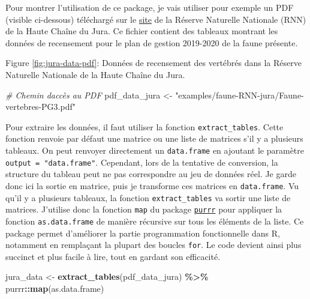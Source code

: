 \documentclass[
  french,
]{book}
\newenvironment{Shaded}{\begin{snugshade}}{\end{snugshade}}
\newcommand{\CommentTok}[1]{\textcolor[rgb]{0.56,0.35,0.01}{\textit{#1}}}
\newcommand{\KeywordTok}[1]{\textcolor[rgb]{0.13,0.29,0.53}{\textbf{#1}}}
\newcommand{\NormalTok}[1]{#1}
\newcommand{\OperatorTok}[1]{\textcolor[rgb]{0.81,0.36,0.00}{\textbf{#1}}}
\newcommand{\StringTok}[1]{\textcolor[rgb]{0.31,0.60,0.02}{#1}}
\begin{document}
Pour montrer l'utilisation de ce package, je vais utiliser pour exemple un PDF
(visible ci-dessous) téléchargé sur le
\href{https://www.rnn-hautechainedujura.fr/patrimoine-naturel/faune/}{site} de la
Réserve Naturelle Nationale (RNN) de la Haute Chaîne du Jura. Ce fichier
contient des tableaux montrant les données de recensement pour le plan de
gestion 2019-2020 de la faune présente.

\label{fig:jura-data-pdf} Figure \ref{fig:jura-data-pdf}: Données de recensement des vertébrés dans la Réserve Naturelle Nationale de la Haute Chaîne du Jura.

\begin{Shaded}
\begin{Highlighting}[]
\CommentTok{\# Chemin d\textquotesingle{}accès au PDF}
\NormalTok{pdf\_data\_jura \textless{}{-}}\StringTok{ "examples/faune{-}RNN{-}jura/Faune{-}vertebres{-}PG3.pdf"}
\end{Highlighting}
\end{Shaded}

Pour extraire les données, il faut utiliser la fonction \texttt{extract\_tables}. Cette
fonction renvoie par défaut une matrice ou une liste de matrices s'il y a
plusieurs tableaux. On peut renvoyer directement un \texttt{data.frame} en ajoutant le
paramètre \texttt{output\ =\ "data.frame"}. Cependant, lors de la tentative de
conversion, la structure du tableau peut ne pas correspondre au jeu de données
réel. Je garde donc ici la sortie en matrice, puis je transforme ces matrices en
\texttt{data.frame}. Vu qu'il y a plusieurs tableaux, la fonction \texttt{extract\_tables} va
sortir une liste de matrices. J'utilise donc la fonction \texttt{map} du package
\href{https://purrr.tidyverse.org/}{\texttt{purrr}} pour appliquer la fonction
\texttt{as.data.frame} de manière récursive sur tous les éléments de la liste. Ce
package permet d'améliorer la partie programmation fonctionnelle dans R,
notamment en remplaçant la plupart des boucles \texttt{for}. Le code devient ainsi plus
succinct et plus facile à lire, tout en gardant son efficacité.

\begin{Shaded}
\begin{Highlighting}[]
\NormalTok{jura\_data \textless{}{-}}\StringTok{ }\KeywordTok{extract\_tables}\NormalTok{(pdf\_data\_jura) }\OperatorTok{\%\textgreater{}\%}\StringTok{ }
\StringTok{  }\NormalTok{purrr}\OperatorTok{::}\KeywordTok{map}\NormalTok{(as.data.frame)}
\end{Highlighting}
\end{Shaded}
\end{document}
